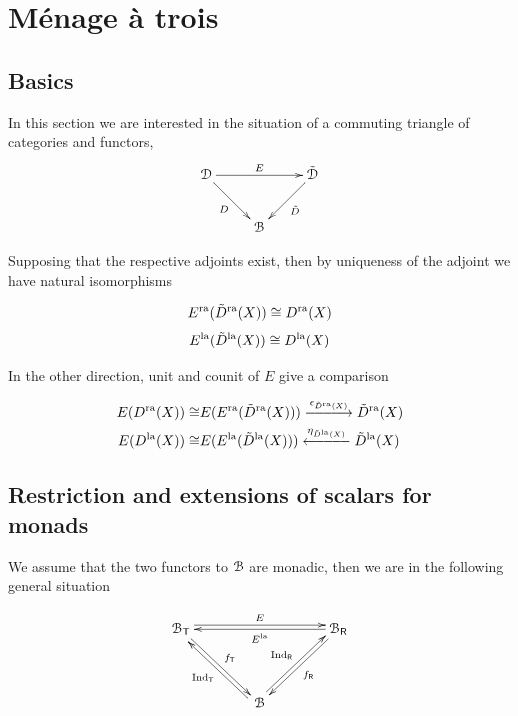 \documentclass[a4paper, reqno]{amsart}
\theoremstyle{introTheorems}
\renewcommand{\1}{\mathbbold{1}}
\begin{document}
\section{Ménage à trois}\label{sec_troi}


\subsection{Basics}\label{subsec:troi}

In this section we are interested in the situation of a commuting triangle of categories and functors,
\begin{equation}\label{formula_TriangleSituation}
\xymatrix{
\catD 
\ar[rr]^{\funE}
\ar[rd]_{\funD}
&&
\catDD
\ar[ld]^{\funDD}
\\
&
\catB
&
\\
} 
\end{equation}

Supposing that the respective adjoints exist, then by uniqueness of the adjoint we have natural isomorphisms

$$E^{\mathrm{ra}}(\tilde{D}^{\mathrm{ra}}(X))\cong D^{\mathrm{ra}}(X)$$
$$E^{\mathrm{la}}(\tilde{D}^{\mathrm{la}}(X))\cong D^{\mathrm{la}}(X)$$

In the other direction, unit and counit of $E$ give a comparison

\begin{align}\label{formula_EcomparisonRa}
\funE(\funD^\ra(X))
\cong
&\funE(\funE^\ra(\funDD^\ra(X)))
\stackrel{\epsilon_{\funDD^\ra(X)}}{\relbar\joinrel\relbar\joinrel\relbar\joinrel\longrightarrow}
\funDD^\ra(X)\\ \label{formula_EcomparisonLa}
\funE(\funD^\la(X))
\cong
&\funE(\funE^\la(\funDD^\la(X)))
\stackrel{\eta_{\funDD^\la(X)}}{\longleftarrow\joinrel\relbar\joinrel\relbar\joinrel\relbar}
\funDD^\la(X)
\end{align}


\subsection{Restriction and extensions of scalars for monads}\label{subsec:monadRestriction}

We assume that the two functors to $\mathcal{B}$ are monadic, then we are in the following general situation

\begin{equation}\label{formula_monadTriangleSituation}
\xymatrix@C=4em@R=4em{
\cat_{\monT} 
\ar@<3pt>[rr]^{\funE}
\ar[rd]^{\forget_\monT}
&&
\cat_{\monR}
\ar[ld]^{\forget_\monR}
\ar[ll]^{\funE^\la}
\\
&
\catB
\ar@<3pt>[lu]^{\funT}
\ar@<3pt>[ru]^{\funR}
&
\\
} 
\end{equation}
\end{document}
